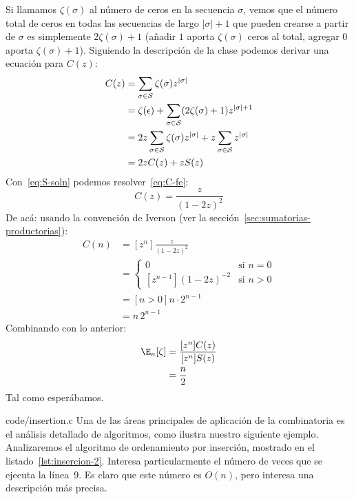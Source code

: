  Si llamamos \(\zeta(\sigma)\) al número de ceros
  en la secuencia \(\sigma\),
  vemos que el número total de ceros
  en todas las secuencias de largo \(\lvert \sigma \rvert + 1\)
  que pueden crearse a partir de \(\sigma\)
  es simplemente \(2 \zeta(\sigma) + 1\)
  (añadir \(1\) aporta \(\zeta(\sigma)\) ceros al total,
   agregar \(0\) aporta \(\zeta(\sigma) + 1\)).
  Siguiendo la descripción de la clase
  podemos derivar una ecuación para \(C(z)\):
  \begin{align}
    C(z)
      &= \sum_{\sigma \in \mathcal{S}}
	   \zeta(\sigma) z^{\lvert \sigma \rvert}
		     \label{eq:C-def} \\
      &= \zeta(\epsilon)
	   + \sum_{\sigma \in \mathcal{S}}
	       (2 \zeta(\sigma) + 1) z^{\lvert \sigma \rvert + 1}
		      \notag \\
      &= 2 z \sum_{\sigma \in \mathcal{S}}
	     \zeta(\sigma)  z^{\lvert \sigma \rvert}
	   + z \sum_{\sigma \in \mathcal{S}} z^{\lvert \sigma \rvert}
		      \notag \\
      &= 2 z C(z) + z S(z)
		      \label{eq:C-fe}
  \end{align}
  Con~\eqref{eq:S-soln} podemos resolver~\eqref{eq:C-fe}:
  \begin{equation}
    \label{eq:C-soln}
    C(z)
      = \frac{z}{(1 - 2 z)^2}
  \end{equation}
  De acá:
  usando la convención de Iverson
  (ver la sección~\ref{sec:sumatorias-productorias}):%
  \begin{align*}
    [z^n] C(n)
       &= [z^n] \frac{z}{(1 - 2 z)^2} \\
       &= \begin{cases}
	     0				& \text{si \(n = 0\)} \\
	     [z^{n - 1}] (1 - 2 z)^{-2} & \text{si \(n > 0\)}
	  \end{cases} \\
       &= [n > 0] n \cdot 2^{n - 1} \\
       &= n \, 2^{n - 1}
  \end{align*}
  Combinando con lo anterior:%
  \begin{align}
    \E_n[\zeta]
       &= \frac{[z^n] C(z)}{[z^n] S(z)} \notag \\
       &= \frac{n}{2}  \label{eq:E(zeta)}
  \end{align}
  Tal como esperábamos.

  
		  {code/insertion.c}
  Una de las áreas principales de aplicación de la combinatoria
  es el análisis detallado de algoritmos,%
  como ilustra nuestro siguiente ejemplo.
  Analizaremos el algoritmo de ordenamiento por inserción,
  mostrado en el listado~\ref{lst:insercion-2}.%
  Interesa particularmente el número de veces que se ejecuta la línea~9.
  Es claro que este número es \(O(n)\),
  pero interesa una descripción más precisa.

